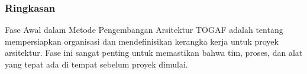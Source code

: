 \documentclass[aspectratio=169, table]{beamer}
\begin{document}
	\begin{frame}
		\frametitle{Ringkasan}
		Fase Awal dalam Metode Pengembangan Arsitektur TOGAF adalah tentang mempersiapkan organisasi dan mendefinisikan kerangka kerja untuk proyek arsitektur. Fase ini sangat penting untuk memastikan bahwa tim, proses, dan alat yang tepat ada di tempat sebelum proyek dimulai.
	\end{frame}
\end{document}
